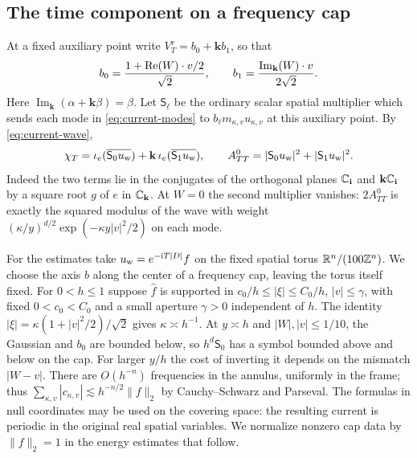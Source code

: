 \subsection{The time component on a frequency cap}

At a fixed auxiliary point write $V_T^v=b_0+\mathbf k b_1$, so that
\[
 b_0=\frac{1+\operatorname{Re}(W)\cdot v/2}{\sqrt2},\qquad
 b_1=\frac{\operatorname{Im}_{\mathbf k}(W)\cdot v}{2\sqrt2}.
\]
Here $\operatorname{Im}_{\mathbf k}(\alpha+\mathbf k\beta)=\beta$.
Let $\mathsf S_\ell$ be the ordinary scalar spatial multiplier which sends each
mode in \eqref{eq:current-modes} to $b_\ell m_{\kappa,v}u_{\kappa,v}$
at this auxiliary point. By \eqref{eq:current-wave},
\begin{equation}\label{eq:current-time-multipliers}
 \chi_T=\iota_e(\overline{\mathsf S_0u_{\rm w}})
              +\mathbf k\,\iota_e(\overline{\mathsf S_1u_{\rm w}}),\qquad
 A^0_{TT}=|\mathsf S_0u_{\rm w}|^2+|\mathsf S_1u_{\rm w}|^2 .
\end{equation}
Indeed the two terms lie in the conjugates of the orthogonal planes
$\mathbb C_{\mathbf i}$ and $\mathbf k\mathbb C_{\mathbf i}$ by a square root $g$
of $e$ in $\mathbb C_{\mathbf k}$. At $W=0$ the second multiplier vanishes:
$2A^0_{TT}$ is exactly the squared modulus of the wave with weight
$(\kappa/y)^{d/2}\exp(-\kappa y|v|^2/2)$ on each mode.

For the estimates take $u_{\rm w}=e^{-\mathrm iT|D|}f$ on the fixed
spatial torus $\mathbb R^n/(100\mathbb Z^n)$. We choose the axis $b$ along
the center of a frequency cap, leaving the torus itself fixed. For
$0<h\le1$ suppose $\widehat f$ is supported in
$c_0/h\le|\xi|\le C_0/h$, $|v|\le\gamma$, with fixed $0<c_0<C_0$
and a small aperture $\gamma>0$ independent of $h$.
The identity $|\xi|=\kappa(1+|v|^2/2)/\sqrt2$ gives
$\kappa\asymp h^{-1}$. At $y\asymp h$ and $|W|,|v|\le1/10$,
the Gaussian and $b_0$ are bounded below, so $h^d\mathsf S_0$
has a symbol bounded above and below on the cap. For larger $y/h$
the cost of inverting it depends on the mismatch $|W-v|$.
There are $O(h^{-n})$ frequencies in the annulus, uniformly in the
frame; thus
$\sum_{\kappa,v}|c_{\kappa,v}|\lesssim h^{-n/2}\|f\|_2$ by
Cauchy--Schwarz and Parseval. The formulas in null coordinates may be
used on the covering space: the resulting current is periodic in the
original real spatial variables. We normalize nonzero cap data by
$\|f\|_2=1$ in the energy estimates that follow.
